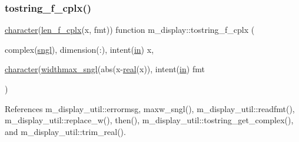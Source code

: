 \subsubsection{\texorpdfstring{tostring\+\_\+f\+\_\+cplx()}{tostring\_f\_cplx()}}
{\footnotesize\ttfamily \hyperlink{option__stopwatch_83_8txt_abd4b21fbbd175834027b5224bfe97e66}{character}(\hyperlink{namespacem__display_a37f268a7276f14d4975200a8f83acff3}{len\+\_\+f\+\_\+cplx}(x, fmt)) function m\+\_\+display\+::tostring\+\_\+f\+\_\+cplx (\begin{DoxyParamCaption}\item[{complex(\hyperlink{namespacem__display_a2ac86bc535c3ccc5947dbb3109c666b5}{sngl}), dimension(\+:), intent(\hyperlink{M__journal_83_8txt_afce72651d1eed785a2132bee863b2f38}{in})}]{x,  }\item[{\hyperlink{option__stopwatch_83_8txt_abd4b21fbbd175834027b5224bfe97e66}{character}(\hyperlink{namespacem__display_a3bb36db16c84ea38d1697191adbc027a}{widthmax\+\_\+sngl}(abs(x-\/\hyperlink{read__watch_83_8txt_abdb62bde002f38ef75f810d3a905a823}{real}(x)), intent(\hyperlink{M__journal_83_8txt_afce72651d1eed785a2132bee863b2f38}{in})}]{fmt }\end{DoxyParamCaption})\hspace{0.3cm}{\ttfamily [private]}}



References m\+\_\+display\+\_\+util\+::errormsg, maxw\+\_\+sngl(), m\+\_\+display\+\_\+util\+::readfmt(), m\+\_\+display\+\_\+util\+::replace\+\_\+w(), then(), m\+\_\+display\+\_\+util\+::tostring\+\_\+get\+\_\+complex(), and m\+\_\+display\+\_\+util\+::trim\+\_\+real().

